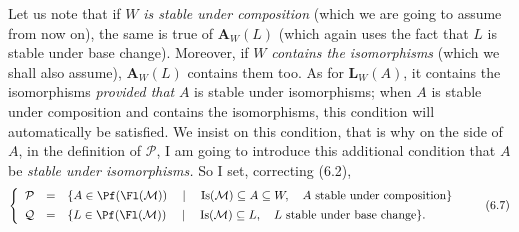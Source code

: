 Let us note that if $W$ \textit{is stable under composition} (which we are going to assume from now on), the same is true of $\mathbf{A}_W(L)$ (which again uses the fact that $L$ is stable under base change). Moreover, if $W$ \textit{contains the isomorphisms} (which we shall also assume), $\mathbf{A}_W(L)$ contains them too. As for $\mathbf{L}_W(A)$, it contains the isomorphisms \textit{provided that} $A$ is stable under isomorphisms; when $A$ is stable under composition and contains the isomorphisms, this condition will automatically be satisfied. We insist on this condition, that is why on the side of $A$, in the definition of $\mathcal{P}$, I am going to introduce this additional condition that $A$ be \textit{stable under isomorphisms.} So I set, correcting (6.2),
\[
\left\{
\begin{array}{rcl}
\mathcal{P} & = & \{A\in\Pf(\Fl(\mathcal{M}))\quad\mid\quad\mathrm{Is}(\mathcal{M})\subseteq A\subseteq W,\quad A\text{ stable under composition}\}\\[1ex]
\mathcal{Q} & = & \{L\in\Pf(\Fl(\mathcal{M}))\quad\mid\quad\mathrm{Is}(\mathcal{M})\subseteq L,\quad L\text{ stable under base change}\}.
\end{array}
\right.
\tag*{(6.7)}
\]